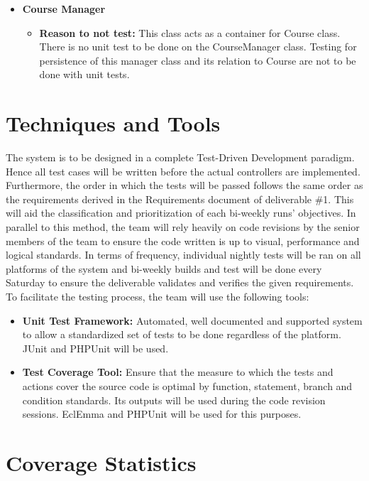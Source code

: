 \documentclass[12pt]{report}
\begin{document}
    \begin{itemize}
    	\item \textbf{Course Manager}
    	\begin{itemize}
    		\item \textbf{Reason to not test:} This class acts as a container for Course class. There is no unit test to be done on the CourseManager class. Testing for persistence of this manager class and its relation to Course are not to be done with unit tests.
    	\end{itemize}
    \end{itemize}
    
    \section{Techniques and Tools}
    
	The system is to be designed in a complete Test-Driven Development paradigm. Hence all test
	cases will be written before the actual controllers are implemented. Furthermore, the order in
	which the tests will be passed follows the same order as the requirements derived in the
	Requirements document of deliverable \#1. This will aid the classification and prioritization of
	each bi-weekly runs' objectives. In parallel to this method, the team will rely heavily on code
	revisions by the senior members of the team to ensure the code written is up to visual,
	performance and logical standards. In terms of frequency, individual nightly tests will be ran
	on all platforms of the system and bi-weekly builds and test will be done every Saturday to
	ensure the deliverable validates and verifies the given requirements. To facilitate the testing
	process, the team will use the following tools:
    
    \begin{itemize}
        \item \textbf{Unit Test Framework:} Automated, well documented and supported system to allow a standardized set of tests to be done regardless of the platform. JUnit and PHPUnit will be used.
        \item \textbf{Test Coverage Tool:} Ensure that the measure to which the tests and actions cover the source code is optimal by function, statement, branch and condition standards. Its outputs will be used during the code revision sessions. EclEmma and PHPUnit will be used for this purposes.
    \end{itemize}
    
    \section{Coverage Statistics}
    
\end{document}
